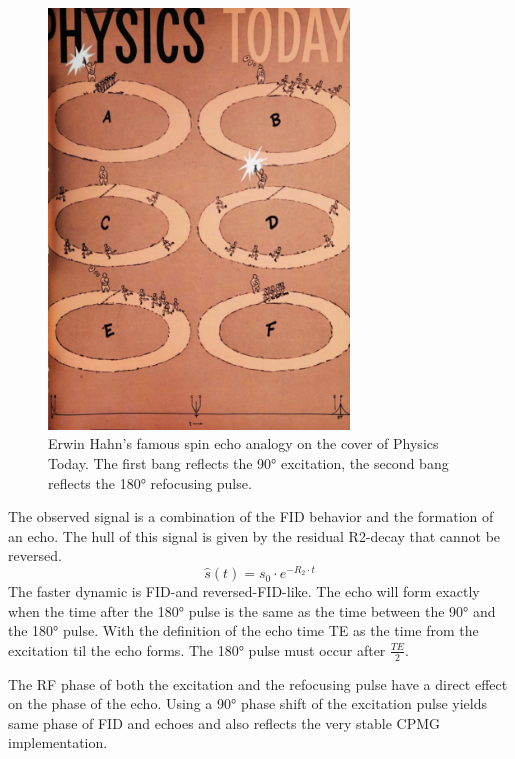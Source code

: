 \documentclass[a4paper,12pt]{extarticle}
\begin{document}
\begin{figure}[!ht] 
\centering
\includegraphics[width=8cm]{img/SE_run.png}
\caption{Erwin Hahn’s famous spin echo analogy on the cover of Physics Today. The first bang reflects the 90° excitation, the second bang reflects the 180° refocusing pulse.} \label{fig:SE_hahn}
\end{figure}
The observed signal is a combination of the FID behavior and the formation of an echo. The hull of this signal is given by the residual R2-decay that cannot be reversed. 
\begin{equation}
\label{eq:SE}
\hat{s}(t)=s_0\cdot  e^{-R_2\cdot t}
\end{equation}
The faster dynamic is FID-and reversed-FID-like.
The echo will form exactly when the time after the 180° pulse is the same as the time between the 90° and the 180° pulse. With the definition of the echo time TE as the time from the excitation til the echo forms. The 180° pulse must occur after $\frac{TE}{2}$.

The RF phase of both the excitation and the refocusing pulse have a direct effect on the phase of the echo. Using a 90° phase shift of the excitation pulse yields same phase of FID and echoes and also reflects the very stable CPMG implementation.
\end{document}

